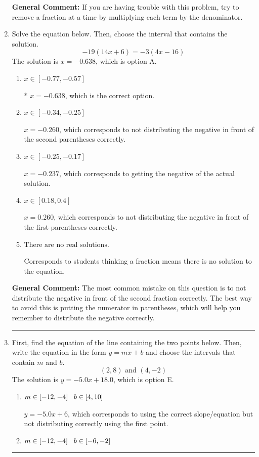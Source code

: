\documentclass{extbook}[14pt]
\newcommand{\litem}[1]{\item #1

\rule{\textwidth}{0.4pt}}
\begin{document}
\begin{enumerate}
{\textbf{General Comment:} If you are having trouble with this problem, try to remove a fraction at a time by multiplying each term by the denominator.
}
\litem{
Solve the equation below. Then, choose the interval that contains the solution.
\[ -19(14x + 6) = -3(4x -16) \]The solution is \( x = -0.638 \), which is option A.\begin{enumerate}[label=\Alph*.]
\item \( x \in [-0.77, -0.57] \)

* $x = -0.638$, which is the correct option.
\item \( x \in [-0.34, -0.25] \)

$x = -0.260$, which corresponds to not distributing the negative in front of the second parentheses correctly.
\item \( x \in [-0.25, -0.17] \)

$x = -0.237$, which corresponds to getting the negative of the actual solution.
\item \( x \in [0.18, 0.4] \)

$x = 0.260$, which corresponds to not distributing the negative in front of the first parentheses correctly.
\item \( \text{There are no real solutions.} \)

Corresponds to students thinking a fraction means there is no solution to the equation.
\end{enumerate}

\textbf{General Comment:} The most common mistake on this question is to not distribute the negative in front of the second fraction correctly. The best way to avoid this is putting the numerator in parentheses, which will help you remember to distribute the negative correctly.
}
\litem{
First, find the equation of the line containing the two points below. Then, write the equation in the form $ y=mx+b $ and choose the intervals that contain $m$ and $b$.
\[ (2, 8) \text{ and } (4, -2) \]The solution is \( y = -5.0x + 18.0 \), which is option E.\begin{enumerate}[label=\Alph*.]
\item \( m \in [-12, -4] \hspace*{3mm} b \in [4, 10] \)

 $y = -5.0x + 6$, which corresponds to using the correct slope/equation but not distributing correctly using the first point.
\item \( m \in [-12, -4] \hspace*{3mm} b \in [-6, -2] \)


\end{enumerate}}
\end{enumerate}
\end{document}
